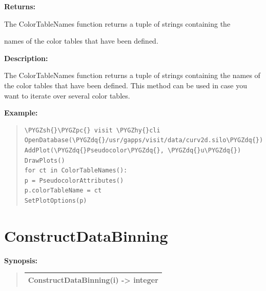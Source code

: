 \documentclass[letterpaper,10pt,english]{sphinxmanual}
\def\PYGZsh{\char`\#}
\def\PYGZpc{\char`\%}
\def\PYGZhy{\char`\-}
\def\PYGZdq{\char`\"}
\begin{document}
\begin{DUlineblock}{0em}
\item[] 
\item[] \textbf{Returns:}
\item[] The ColorTableNames function returns a tuple of strings containing the
\item[] names of the color tables that have been defined.
\item[] 
\item[] \textbf{Description:}
\item[] The ColorTableNames function returns a tuple of strings containing the
names of the color tables that have been defined. This method can be used
in case you want to iterate over several color tables.
\end{DUlineblock}

\begin{DUlineblock}{0em}
\item[] 
\end{DUlineblock}

\begin{DUlineblock}{0em}
\item[] \textbf{Example:}
\item[] 
\end{DUlineblock}
\begin{quote}

\begin{Verbatim}[commandchars=\\\{\}]
\PYGZsh{}\PYGZpc{} visit \PYGZhy{}cli
OpenDatabase(\PYGZdq{}/usr/gapps/visit/data/curv2d.silo\PYGZdq{})
AddPlot(\PYGZdq{}Pseudocolor\PYGZdq{}, \PYGZdq{}u\PYGZdq{})
DrawPlots()
for ct in ColorTableNames():
p = PseudocolorAttributes()
p.colorTableName = ct
SetPlotOptions(p)
\end{Verbatim}
\end{quote}


\section{ConstructDataBinning}
\label{functions:constructdatabinning}
\begin{DUlineblock}{0em}
\item[] \textbf{Synopsis:}
\end{DUlineblock}
\begin{quote}

\begin{tabulary}{\linewidth}{|L|}
\hline

ConstructDataBinning(i) -\textgreater{} integer
\\
\hline\end{tabulary}

\end{quote}
\end{document}
